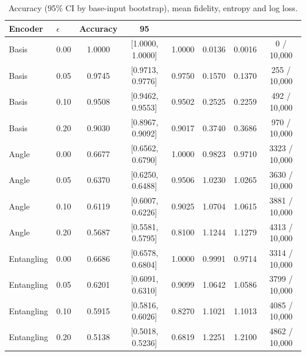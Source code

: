 \begin{table}[htbp]
\centering
\small
\caption{Accuracy (95\% CI by base-input bootstrap), mean fidelity, entropy and log loss.}
\label{tab:accuracy}
\begin{tabular}{llcccccc}
\toprule
Encoder & $\epsilon$ & Accuracy & 95\\%
\midrule
Basis & 0.00 & 1.0000 & [1.0000, 1.0000] & 1.0000 & 0.0136 & 0.0016 & 0 / 10{,}000 \\
Basis & 0.05 & 0.9745 & [0.9713, 0.9776] & 0.9750 & 0.1570 & 0.1370 & 255 / 10{,}000 \\
Basis & 0.10 & 0.9508 & [0.9462, 0.9553] & 0.9502 & 0.2525 & 0.2259 & 492 / 10{,}000 \\
Basis & 0.20 & 0.9030 & [0.8967, 0.9092] & 0.9017 & 0.3740 & 0.3686 & 970 / 10{,}000 \\
\midrule
Angle & 0.00 & 0.6677 & [0.6562, 0.6790] & 1.0000 & 0.9823 & 0.9710 & 3323 / 10{,}000 \\
Angle & 0.05 & 0.6370 & [0.6250, 0.6488] & 0.9506 & 1.0230 & 1.0265 & 3630 / 10{,}000 \\
Angle & 0.10 & 0.6119 & [0.6007, 0.6226] & 0.9025 & 1.0704 & 1.0615 & 3881 / 10{,}000 \\
Angle & 0.20 & 0.5687 & [0.5581, 0.5795] & 0.8100 & 1.1244 & 1.1279 & 4313 / 10{,}000 \\
\midrule
Entangling & 0.00 & 0.6686 & [0.6578, 0.6804] & 1.0000 & 0.9991 & 0.9714 & 3314 / 10{,}000 \\
Entangling & 0.05 & 0.6201 & [0.6091, 0.6310] & 0.9099 & 1.0642 & 1.0586 & 3799 / 10{,}000 \\
Entangling & 0.10 & 0.5915 & [0.5816, 0.6026] & 0.8270 & 1.1021 & 1.1013 & 4085 / 10{,}000 \\
Entangling & 0.20 & 0.5138 & [0.5018, 0.5236] & 0.6819 & 1.2251 & 1.2100 & 4862 / 10{,}000 \\
\bottomrule
\end{tabular}
\end{table}
